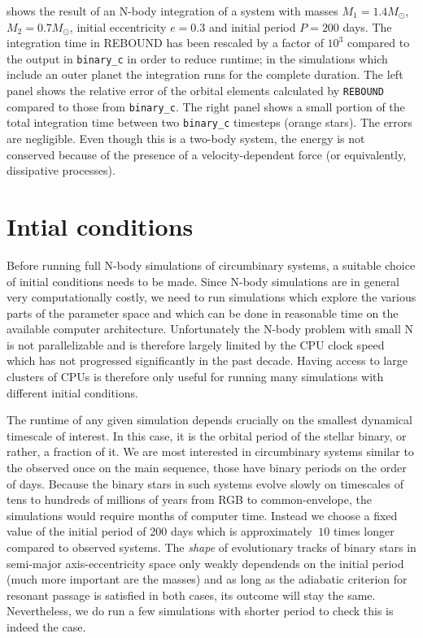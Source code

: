 \documentclass[ twoside,openright,titlepage,numbers=noenddot,headinclude,%
                footinclude=true,cleardoublepage=empty,abstractoff, %
                BCOR=5mm,paper=a4,fontsize=11pt,%
                american,%
                ]{scrreprt}
\begin{document}
shows the result of an N-body integration of a system with masses $M_1=1.4 M_\odot$,
$M_2=0.7 M_\odot$, initial eccentricity $e=0.3$ and initial period $P=200$ days. 
The integration time in REBOUND has been rescaled by a factor of $10^3$ compared to 
the output in \texttt{binary\_c} in order to reduce runtime; in the simulations which
include an outer planet the integration runs for the complete duration.
The left panel shows the relative error of the orbital elements calculated by
\texttt{REBOUND} compared to those from \texttt{binary\_c}. The right panel shows a 
small portion of the total integration time between two \texttt{binary\_c}
timesteps (orange stars). The errors are negligible. Even though this is a
two-body system, the energy is not conserved because of the presence of a 
velocity-dependent force (or equivalently, dissipative processes). 

\section{Intial conditions}
\label{sec:Intial conditions}
Before running full N-body simulations of circumbinary systems, a suitable choice
of initial conditions needs to be made. Since N-body simulations are in general very
computationally costly, we need to run simulations which explore the various parts
of the parameter space and which can be done in reasonable time on the available 
computer architecture. Unfortunately the N-body problem with small N is not 
parallelizable and is therefore largely limited by the CPU clock speed which has not
progressed significantly in the past decade. Having access to large clusters 
of CPUs is therefore only useful for running many simulations with different 
initial conditions.

The runtime of any given simulation depends crucially on the smallest dynamical 
timescale of interest. In this case, it is the orbital period of the stellar binary,
or rather, a fraction of it. We are most interested in circumbinary systems similar 
to the observed once on the main sequence, those have binary periods on the order of days.
Because the binary stars in such systems evolve slowly on timescales of tens to 
hundreds of millions of years from RGB to common-envelope, the simulations would 
require months of computer time. Instead we choose a fixed value of the initial period of
200 days which is approximately $~10$ times longer compared to observed systems. 
The \emph{shape}  of evolutionary tracks of binary stars in semi-major axis-eccentricity 
space only weakly dependends on the initial period (much more important are the masses)
and as long as the adiabatic criterion for resonant passage is satisfied in both cases,
its outcome will stay the same. Nevertheless, we do run a few simulations with
shorter period to check this is indeed the case.
\end{document}
